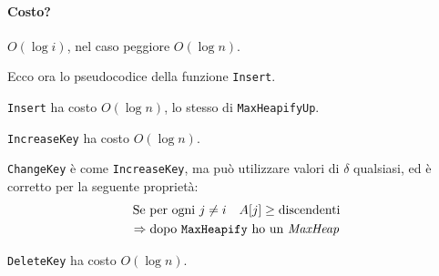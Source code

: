 \paragraph{Costo?} $O(\log i)$, nel caso peggiore $O(\log n)$.
\bigskip

Ecco ora lo pseudocodice della funzione \texttt{Insert}.

\texttt{Insert} ha costo $O(\log n)$, lo stesso di \texttt{MaxHeapifyUp}.


\texttt{IncreaseKey} ha costo $O(\log n)$.

 
\texttt{ChangeKey} è come \texttt{IncreaseKey}, ma può utilizzare valori di $\delta$ qualsiasi, ed è
corretto per la seguente proprietà:
\begin{gather*}
	\text{Se per ogni } j \neq i \quad A[j] \geq \text{discendenti} \\
	\Rightarrow \text{dopo \texttt{MaxHeapify} ho un \emph{MaxHeap}}
\end{gather*}


\texttt{DeleteKey} ha costo $O(\log n)$.